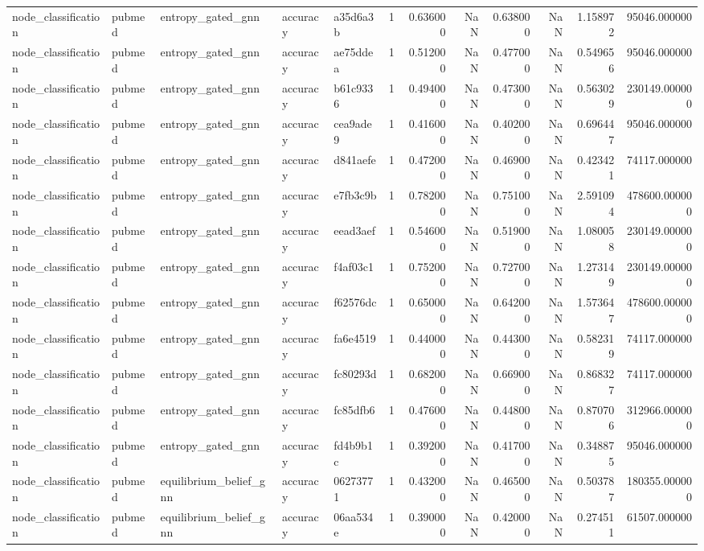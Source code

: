 \begin{tabular}{lllllrrrrrrr}
node_classification & pubmed & entropy_gated_gnn & accuracy & a35d6a3b & 1 & 0.636000 & NaN & 0.638000 & NaN & 1.158972 & 95046.000000 \\
node_classification & pubmed & entropy_gated_gnn & accuracy & ae75ddea & 1 & 0.512000 & NaN & 0.477000 & NaN & 0.549656 & 95046.000000 \\
node_classification & pubmed & entropy_gated_gnn & accuracy & b61c9336 & 1 & 0.494000 & NaN & 0.473000 & NaN & 0.563029 & 230149.000000 \\
node_classification & pubmed & entropy_gated_gnn & accuracy & cea9ade9 & 1 & 0.416000 & NaN & 0.402000 & NaN & 0.696447 & 95046.000000 \\
node_classification & pubmed & entropy_gated_gnn & accuracy & d841aefe & 1 & 0.472000 & NaN & 0.469000 & NaN & 0.423421 & 74117.000000 \\
node_classification & pubmed & entropy_gated_gnn & accuracy & e7fb3c9b & 1 & 0.782000 & NaN & 0.751000 & NaN & 2.591094 & 478600.000000 \\
node_classification & pubmed & entropy_gated_gnn & accuracy & eead3aef & 1 & 0.546000 & NaN & 0.519000 & NaN & 1.080058 & 230149.000000 \\
node_classification & pubmed & entropy_gated_gnn & accuracy & f4af03c1 & 1 & 0.752000 & NaN & 0.727000 & NaN & 1.273149 & 230149.000000 \\
node_classification & pubmed & entropy_gated_gnn & accuracy & f62576dc & 1 & 0.650000 & NaN & 0.642000 & NaN & 1.573647 & 478600.000000 \\
node_classification & pubmed & entropy_gated_gnn & accuracy & fa6e4519 & 1 & 0.440000 & NaN & 0.443000 & NaN & 0.582319 & 74117.000000 \\
node_classification & pubmed & entropy_gated_gnn & accuracy & fc80293d & 1 & 0.682000 & NaN & 0.669000 & NaN & 0.868327 & 74117.000000 \\
node_classification & pubmed & entropy_gated_gnn & accuracy & fc85dfb6 & 1 & 0.476000 & NaN & 0.448000 & NaN & 0.870706 & 312966.000000 \\
node_classification & pubmed & entropy_gated_gnn & accuracy & fd4b9b1c & 1 & 0.392000 & NaN & 0.417000 & NaN & 0.348875 & 95046.000000 \\
node_classification & pubmed & equilibrium_belief_gnn & accuracy & 06273771 & 1 & 0.432000 & NaN & 0.465000 & NaN & 0.503787 & 180355.000000 \\
node_classification & pubmed & equilibrium_belief_gnn & accuracy & 06aa534e & 1 & 0.390000 & NaN & 0.420000 & NaN & 0.274511 & 61507.000000 \\

\end{tabular}
